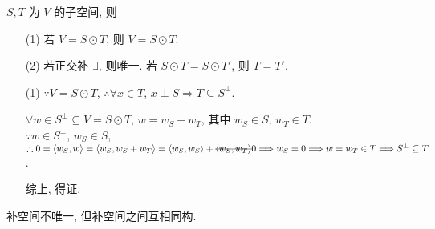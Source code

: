 \documentclass{note}
\begin{document}
\begin{thm}[(课本定理 13.12)]
    $S,T$ 为 $V$ 的子空间, 则
    \begin{itemize}
        \item[(1)] 若 $V=S\odot T$, 则 $V=S\odot T$.
        \item[(2)] 若正交补 $\exists$, 则唯一. 若 $S\odot T=S\odot T'$, 则 $T=T'$.
    \end{itemize}
\end{thm}
\begin{pf}
    \begin{itemize}
        \item[(1)] $\because V=S\odot T$, $\therefore\forall x\in T$, $x\perp S\Longrightarrow T\subseteq S^{\perp}$.

        $\forall w\in S^{\perp}\subseteq V=S\odot T$, $w=w_S+w_T$, 其中 $w_S\in S$, $w_T\in T$.\\
        $\because w\in S^{\perp}$, $w_S\in S$, $\therefore 0=\langle w_S,w\rangle=\langle w_S,w_S+w_T\rangle=\langle w_S,w_S\rangle+\msout{\langle w_S,w_T\rangle}0\Longrightarrow w_S=0\Longrightarrow w=w_T\in T\Longrightarrow S^{\perp}\subseteq T$.

        综上, 得证.
    \end{itemize}
\end{pf}

补空间不唯一, 但补空间之间互相同构.
\end{document}
